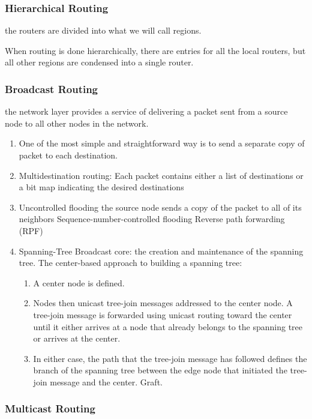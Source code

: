 \subsubsection{Hierarchical Routing}the routers are divided into what we will call regions.

When routing is done hierarchically, there are entries for all the local routers, but all other regions are condensed into a single router.

\subsubsection{Broadcast Routing}the network layer provides a service of delivering a packet sent from a source node to all other nodes in the network. 
\begin{enumerate}
    \item One of the most simple and straightforward way is to send a separate copy of packet to each destination. 
    \item Multidestination routing: Each packet contains either a list of destinations or a bit map indicating the desired destinations
    \item Uncontrolled flooding %
    \subitem the source node sends a copy of the packet to all of its neighbors
    \subitem Sequence-number-controlled flooding
    \subitem Reverse path forwarding (RPF)
    \item Spanning-Tree Broadcast
    \subitem core: the creation and maintenance of the spanning tree. The center-based approach to building a spanning tree:
    \begin{enumerate}
        \item A center node is defined.
        \item Nodes then unicast tree-join messages addressed to the center
        node. A tree-join message is forwarded using unicast routing
        toward the center until it either arrives at a node that already
        belongs to the spanning tree or arrives at the center.
        \item In either case, the path that the tree-join message has followed
        defines the branch of the spanning tree between the edge node that
        initiated the tree-join message and the center. Graft. 
    \end{enumerate}
\end{enumerate}

\subsubsection{Multicast Routing}%

